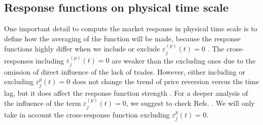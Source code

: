 \subsection{Response functions on physical time scale}
\label{subsec:response_function_physical}

One important detail to compute the market response in physical time scale is
to define how the averaging of the function will be made, because the
response functions highly differ when we include or exclude
$\varepsilon^{\left(p\right)}_j \left( t\right) = 0$ \cite{Wang_2016_cross}.
The cross-responses including
$\varepsilon^{\left(p\right)}_j \left( t\right) = 0$ are weaker than the
excluding ones due to the omission of direct influence of the lack of trades.
However, either including or excluding $\varepsilon^{p}_j \left( t\right) = 0$
does not change the trend of price reversion versus the time lag, but it does
affect the response function strength \cite{Wang_2016_avg}. For a deeper
analysis of the influence of the term
$\varepsilon^{\left(p\right)}_j \left( t\right) = 0$, we suggest to check Refs.
\cite{Wang_2016_avg,Wang_2016_cross}. We will only take in account the
cross-response function excluding $\varepsilon^{p}_j \left( t\right) = 0$.

